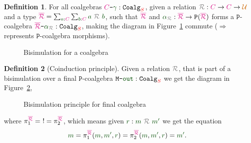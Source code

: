 \documentclass[twoside,11pt,openright]{report}
\theoremstyle{plain} %
\theoremstyle{definition}
\newtheorem{defn}{Definition}[section]
\theoremstyle{remark}
\newcommand*{\figref}[1]{Figure~\ref{fig:#1}}
\newcommand*{\term}[1]{\textcolor{green!30!black}{#1}} %
\newcommand*{\type}[1]{\textcolor{magenta!90!black}{#1}}
\newcommand*{\container}[1]{\textcolor{red}{#1}}
\newcommand*{\universe}[1]{\textcolor{orange!80!black}{#1}}
\newcommand*{\coalg}[2]{#1\texttt{-}#2}
\newcommand*{\relation}[1]{\textcolor{gray}{\ensuremath{\mathtt{#1}}}}
\newcommand*{\function}[1]{\textcolor{blue!60!black}{\ensuremath{\mathtt{#1}}}}
\newcommand*{\typeformer}[1]{\ensuremath{\mathtt{#1}}}
\newcommand*{\functor}[1]{\ensuremath{\mathbf{\mathtt{#1}}}}
\begin{document}
\begin{defn}
  For all coalgebras \(\coalg{\type{C}}{\term{\gamma}} : \typeformer{Coalg}_{\container{S}}\), given a relation \(\relation{\mathcal{R}} : \type{C} \rightarrow \type{C} \rightarrow \universe{\mathcal{U}}\) and a type \(\type{\overline{\mathcal{R}}} = \sum_{\term{a} : \type{C}} \sum_{\term{b} : \type{C}} \term{a}~\relation{\mathcal{R}}~\term{b}\), such that \(\type{\overline{\mathcal{R}}}\) and \(\term{\alpha}_{\relation{\mathcal{R}}} : \type{\overline{\mathcal{R}}} \rightarrow \functor{P}(\type{\overline{\mathcal{R}}})\) forms a \(\functor{P}\)-coalgebra \(\coalg{\type{\overline{\mathcal{R}}}}{\term{\alpha}_{\relation{\mathcal{R}}}} : \mathtt{Coalg}_{\container{S}}\), making the diagram in \figref{coalgebra-coinduction-definition} commute (\(\Longrightarrow\) represents \(\functor{P}\)-coalgebra morphisms).  
  \begin{figure}[h]
    \centering
    \caption{Bisimulation for a coalgebra}
    \label{fig:coalgebra-coinduction-definition}
  \end{figure}
\end{defn}
\begin{defn}[Coinduction principle]
  \noindent Given a relation \(\relation{\mathcal{R}}\), that is part of a bisimulation over a final \(\functor{P}\)-coalgebra \(\coalg{\typeformer{M}}{\term{\mathtt{out}}}:\mathtt{Coalg}_{\container{S}}\) we get the diagram in \figref{final-coalgebra-coinduction},
  
  \begin{figure}[h]
    \centering
    \caption{Bisimulation principle for final coalgebra}
    \label{fig:final-coalgebra-coinduction}
  \end{figure}
  \noindent where \(\pi_1^{\type{\overline{\mathcal{R}}}} = ~! = \pi_2^{\type{\overline{\mathcal{R}}}}\), which means given \(\term{r} : \term{m}~\relation{\mathcal{R}}~\term{m'}\) we get the equation
  \begin{equation}
    \term{m} = \pi_1^{\type{\overline{\mathcal{R}}}} (\term{m}, \term{m'}, \term{r}) = \pi_2^{\type{\overline{\mathcal{R}}}} (\term{m}, \term{m'}, \term{r}) = \term{m'}.
  \end{equation}
\end{defn}
\end{document}
